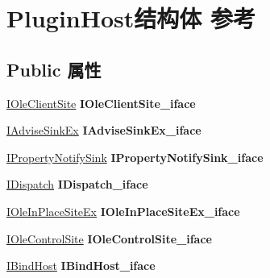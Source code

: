 \hypertarget{struct_plugin_host}{}\section{Plugin\+Host结构体 参考}
\label{struct_plugin_host}
\subsection*{Public 属性}
\begin{DoxyCompactItemize}
\item 
\mbox{\label{struct_plugin_host_a853f037f3af9a35af9b2cd408cc49fa6}} 
\hyperlink{interface_i_ole_client_site}{I\+Ole\+Client\+Site} {\bfseries I\+Ole\+Client\+Site\+\_\+iface}
\item 
\mbox{\label{struct_plugin_host_a2da16a6ff6d896c1ba45a005ed07deb9}} 
\hyperlink{interface_i_advise_sink_ex}{I\+Advise\+Sink\+Ex} {\bfseries I\+Advise\+Sink\+Ex\+\_\+iface}
\item 
\mbox{\label{struct_plugin_host_a5aa8d9df0b4ff63efd1d915a8d3b6691}} 
\hyperlink{interface_i_property_notify_sink}{I\+Property\+Notify\+Sink} {\bfseries I\+Property\+Notify\+Sink\+\_\+iface}
\item 
\mbox{\label{struct_plugin_host_a8ef26613a2ecc363eae2d37690ddaef8}} 
\hyperlink{interface_i_dispatch}{I\+Dispatch} {\bfseries I\+Dispatch\+\_\+iface}
\item 
\mbox{\label{struct_plugin_host_a43ab64339d7b993da5fe7f87e8cea7f0}} 
\hyperlink{interface_i_ole_in_place_site_ex}{I\+Ole\+In\+Place\+Site\+Ex} {\bfseries I\+Ole\+In\+Place\+Site\+Ex\+\_\+iface}
\item 
\mbox{\label{struct_plugin_host_a2edac4fbc25058fdde8e317370ea0550}} 
\hyperlink{interface_i_ole_control_site}{I\+Ole\+Control\+Site} {\bfseries I\+Ole\+Control\+Site\+\_\+iface}
\item 
\mbox{\label{struct_plugin_host_a284139e1ee5820d90b3d0d40c550ec3f}} 
\hyperlink{interface_i_bind_host}{I\+Bind\+Host} {\bfseries I\+Bind\+Host\+\_\+iface}
\item 
\mbox{\label{struct_plugin_host_a66d2463ed87067384f575ce6993fd827}} 

\end{DoxyCompactItemize}
